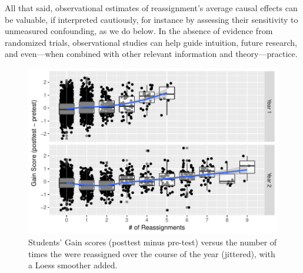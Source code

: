 \documentclass[notitlepage,12pt]{jedm}\usepackage[]{graphicx}\usepackage[]{color}
\makeatletter
\def\maxwidth{ %
  \ifdim\Gin@nat@width>\linewidth
    \linewidth
  \else
    \Gin@nat@width
  \fi
}
\makeatother
\begin{document}
All that said, observational estimates of reassignment's average
causal effects can be valuable, if interpreted cautiously, for
instance by assessing their sensitivity to unmeasured confounding, as
we do below.
In the absence of evidence from randomized trials, observational
studies can help guide intuition, future research, and even---when
combined with other relevant information and theory---practice.







\begin{figure}
  \centering

\includegraphics[width=\maxwidth]{figure/cpYyear-1} 

\caption{Students' Gain scores (posttest minus pre-test) versus the number of times the were reassigned over the course of the year (jittered), with a Loess smoother added.}
\label{fig:cpYyear}
\end{figure}
\end{document}
